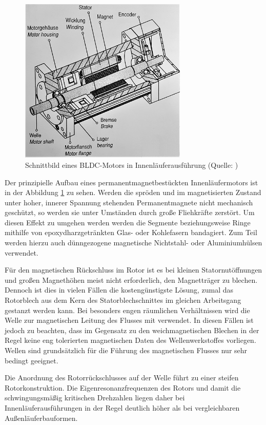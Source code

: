 \begin{figure}[h]
    \centering
    \includegraphics[width=8cm]{./Grafiken/3_1}
    \caption[Schnittbild eines BLDC-Motors in Innenläuferausführung]{Schnittbild eines BLDC-Motors in Innenläuferausführung (Quelle: \parencite[S.75]{Stölting2011})}
    \label{fig:3_1}
  \end{figure}

Der prinzipielle Aufbau eines permanentmagnetbestückten Innenläufermotors ist in der Abbildung \ref{fig:3_1} zu sehen. Werden die spröden und im magnetisierten Zustand unter hoher, innerer Spannung stehenden Permanentmagnete nicht mechanisch geschützt, so werden sie unter Umständen durch große Fliehkräfte zerstört. Um diesen Effekt zu umgehen werden werden die Segmente beziehungsweise Ringe mithilfe von epoxydharzgetränkten Glas- oder Kohlefasern bandagiert. Zum Teil werden hierzu auch dünngezogene magnetische Nichtstahl- oder Aluminiumhülsen verwendet.

Für den magnetischen Rückschluss im Rotor ist es bei kleinen Statornutöffnungen und großen Magnethöhen meist nicht erforderlich, den Magnetträger zu blechen. Dennoch ist dies in vielen Fällen die kostengünstigste Lösung, zumal das Rotorblech aus dem Kern des Statorblechschnittes im gleichen Arbeitsgang gestanzt werden kann. Bei besonders engen räumlichen Verhältnissen wird die Welle zur magnetischen Leitung des Flusses mit verwendet. In diesen Fällen ist jedoch zu beachten, dass im Gegensatz zu den weichmagnetischen Blechen in der Regel keine eng tolerierten magnetischen Daten des Wellenwerkstoffes vorliegen. Wellen sind grundsätzlich für die Führung des magnetischen Flusses nur sehr bedingt geeignet.

Die Anordnung des Rotorrückschlusses auf der Welle führt zu einer steifen Rotorkonstruktion. Die Eigenresonanzfrequenzen des Rotors und damit die schwingungsmäßig kritischen Drehzahlen liegen daher bei Innenläuferausführungen in der Regel deutlich höher als bei vergleichbaren Außenläuferbauformen.

